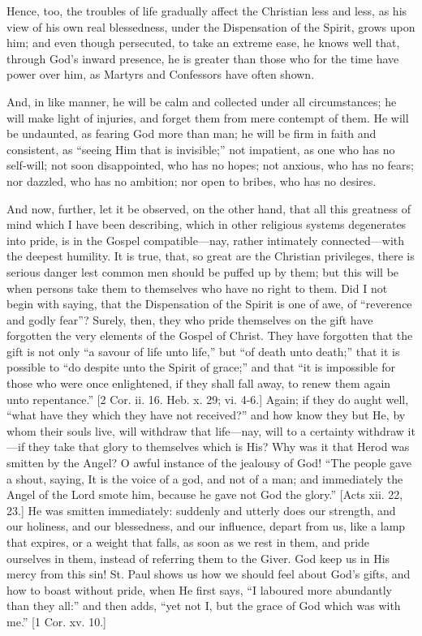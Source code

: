 Hence, too, the troubles of life gradually affect the Christian
less and less, as his view of his own real blessedness, under the
Dispensation of the Spirit, grows upon him; and even though
persecuted, to take an extreme ease, he knows well that, through God's
inward presence, he is greater than those who for the time have power
over him, as Martyrs and Confessors have often shown.

And, in like manner, he will be calm and collected under all
circumstances; he will make light of injuries, and forget them from
mere contempt of them. He will be undaunted, as fearing God more than
man; he will be firm in faith and consistent, as ``seeing Him that
is invisible;'' not impatient, as one who has no self-will; not
soon disappointed, who has no hopes; not anxious, who has no fears;
nor dazzled, who has no ambition; nor open to bribes, who has no
desires.

And now, further, let it be observed, on the other hand, that all
this greatness of mind which I have been describing, which in other
religious systems degenerates into pride, is in the Gospel compatible—nay,
rather intimately connected—with the deepest humility. It is true,
that, so great are the Christian privileges, there is serious danger
lest common men should be puffed up by them; but this will be when
persons take them to themselves who have no right to them. Did I not
begin with saying, that the Dispensation of the Spirit is one of awe,
of ``reverence and godly fear''? Surely, then, they who pride
themselves on the gift have forgotten the very elements of the Gospel
of Christ. They have forgotten that the gift is not only ``a
savour of life unto life,'' but ``of death unto death;''
that it is possible to ``do despite unto the Spirit of
grace;'' and that ``it is impossible for those who were once
enlightened, if they shall fall away, to renew them again unto
repentance.'' [2 Cor. ii. 16. Heb. x. 29; vi. 4-6.] Again; if they
do aught well, ``what have they which they have not
received?'' and how know they but He, by whom their souls live,
will withdraw that life—nay, will to a certainty withdraw it—if
they take that glory to themselves which is His? Why was it that Herod
was smitten by the Angel? O awful instance of the jealousy of God!
``The people gave a shout, saying, It is the voice of a god, and
not of a man; and immediately the Angel of the Lord smote him, because
he gave not God the glory.'' [Acts xii. 22, 23.] He was smitten
immediately: suddenly and utterly does our strength, and our holiness,
and our blessedness, and our influence, depart from us, like a lamp
that expires, or a weight that falls, as soon as we rest in them, and
pride ourselves in them, instead of referring them to the Giver. God
keep us in His mercy from this sin! St. Paul shows us how we should
feel about God's gifts, and how to boast without pride, when He first
says, ``I laboured more abundantly than they all:'' and then
adds, ``yet not I, but the grace of God which was with me.''
[1 Cor. xv. 10.]

